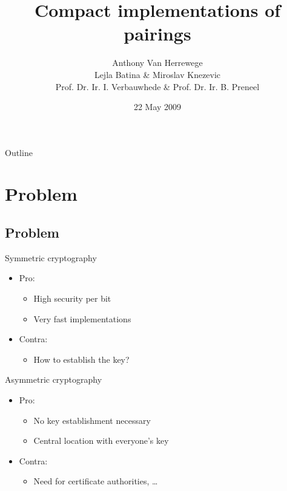 \documentclass[svgnames, handout,t]{beamer}
\title{Compact implementations of pairings}
\author[Anthony Van Herrewege]{Anthony Van Herrewege\\[2em]
\small Lejla Batina \& Miroslav Knezevic\\
Prof. Dr. Ir. I. 	Verbauwhede \& Prof. Dr. Ir. B. Preneel}
\date{22 May 2009}
\begin{document}
\frame{\titlepage}

\section[Outline]{}
\begin{frame}{Outline}
  \tableofcontents
\end{frame}

\section{Problem}
\subsection*{Problem}
\begin{frame}{Symmetric cryptography}
	\begin{itemize}
		\item Pro:
			\begin{itemize}
				\item High security per bit
				\item Very fast implementations
			\end{itemize}
		\item Contra:
			\begin{itemize}
				\item How to establish the key?
			\end{itemize}		
	\end{itemize}
\end{frame}

\begin{frame}{Asymmetric cryptography}
	\begin{itemize}
		\item Pro:
			\begin{itemize}
				\item No key establishment necessary
				\item Central location with everyone's key
			\end{itemize}
		\item Contra:
			\begin{itemize}
				\item Need for certificate authorities, \ldots
			\end{itemize}		
	\end{itemize}
\end{frame}
\end{document}
